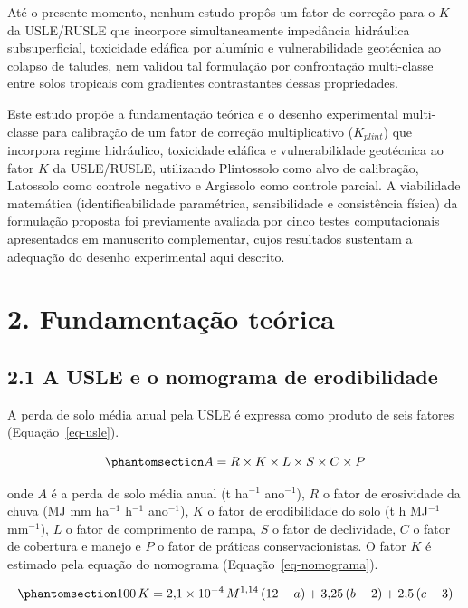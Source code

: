 \documentclass[
  brazilian,
  authoryear,
  preprint]{elsarticle}
\begin{document}
Até o presente momento, nenhum estudo propôs um fator de correção para o
\(K\) da USLE/RUSLE que incorpore simultaneamente impedância hidráulica
subsuperficial, toxicidade edáfica por alumínio e vulnerabilidade
geotécnica ao colapso de taludes, nem validou tal formulação por
confrontação multi-classe entre solos tropicais com gradientes
contrastantes dessas propriedades.

Este estudo propõe a fundamentação teórica e o desenho experimental
multi-classe para calibração de um fator de correção multiplicativo
(\(K_{plint}\)) que incorpora regime hidráulico, toxicidade edáfica e
vulnerabilidade geotécnica ao fator \(K\) da USLE/RUSLE, utilizando
Plintossolo como alvo de calibração, Latossolo como controle negativo e
Argissolo como controle parcial. A viabilidade matemática
(identificabilidade paramétrica, sensibilidade e consistência física) da
formulação proposta foi previamente avaliada por cinco testes
computacionais apresentados em manuscrito complementar, cujos resultados
sustentam a adequação do desenho experimental aqui descrito.

\section{2. Fundamentação teórica}\label{fundamentauxe7uxe3o-teuxf3rica}

\subsection{2.1 A USLE e o nomograma de
erodibilidade}\label{a-usle-e-o-nomograma-de-erodibilidade}

A perda de solo média anual pela USLE é expressa como produto de seis
fatores (Equação~\ref{eq-usle}).

\begin{equation}\phantomsection\label{eq-usle}{
A = R \times K \times L \times S \times C \times P
}\end{equation}

onde \(A\) é a perda de solo média anual (t ha\(^{-1}\) ano\(^{-1}\)),
\(R\) o fator de erosividade da chuva (MJ mm ha\(^{-1}\) h\(^{-1}\)
ano\(^{-1}\)), \(K\) o fator de erodibilidade do solo (t h MJ\(^{-1}\)
mm\(^{-1}\)), \(L\) o fator de comprimento de rampa, \(S\) o fator de
declividade, \(C\) o fator de cobertura e manejo e \(P\) o fator de
práticas conservacionistas. O fator \(K\) é estimado pela equação do
nomograma (Equação~\ref{eq-nomograma}).

\begin{equation}\phantomsection\label{eq-nomograma}{
100\,K = 2{,}1 \times 10^{-4}\,M^{1{,}14}\,(12 - a) + 3{,}25\,(b - 2) + 2{,}5\,(c - 3)
}\end{equation}
\end{document}
